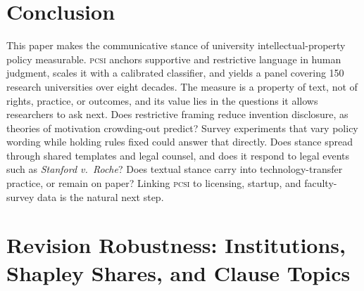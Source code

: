 %
%


\section{Conclusion}

This paper makes the communicative stance of university intellectual-property policy measurable. \textsc{pcsi} anchors supportive and restrictive language in human judgment, scales it with a calibrated classifier, and yields a panel covering 150 research universities over eight decades. The measure is a property of text, not of rights, practice, or outcomes, and its value lies in the questions it allows researchers to ask next. Does restrictive framing reduce invention disclosure, as theories of motivation crowding-out predict? Survey experiments that vary policy wording while holding rules fixed could answer that directly. Does stance spread through shared templates and legal counsel, and does it respond to legal events such as \emph{Stanford v.\ Roche}? Does textual stance carry into technology-transfer practice, or remain on paper? Linking \textsc{pcsi} to licensing, startup, and faculty-survey data is the natural next step.


\section{Revision Robustness: Institutions, Shapley Shares, and Clause Topics}

